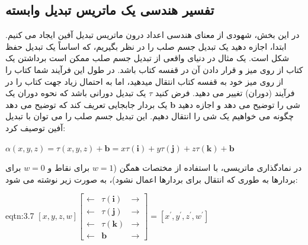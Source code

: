 \subsection{\textbf{تفسیر هندسی یک ماتریس تبدیل وابسته}}
\label{subsec:3.2.5}
{
    \Large
    \begin{spacing}{1.5}
        در این بخش، شهودی از معنای هندسی اعداد درون ماتریس تبدیل آفین ایجاد می کنیم.
        ابتدا، اجازه دهید یک تبدیل جسم صلب را در نظر بگیریم، که اساساً یک تبدیل حفظ شکل است.
        یک مثال در دنیای واقعی از تبدیل جسم صلب ممکن است برداشتن یک کتاب از روی میز و قرار دادن آن در قفسه کتاب باشد.
        در طول این فرآیند شما کتاب را از روی میز خود به قفسه کتاب انتقال میدهید، اما به احتمال زیاد جهت کتاب را در فرآیند (دوران) تغییر می دهید.
        فرض کنید $\tau$ یک تبدیل دورانی باشد که نحوه دوران یک شی را توضیح می دهد و اجازه دهید $\textbf{b}$ یک بردار جابجایی تعریف کند که توضیح می دهد چگونه می خواهیم یک شی را انتقال دهیم. این تبدیل جسم صلب را می توان با تبدیل آفین توصیف کرد:

        \begin{center}
            $\alpha(x,y,z)=\tau(x,y,z)+\textbf{b}=x\tau(\textbf{i})+y\tau(\textbf{j})+z\tau(\textbf{k})+\textbf{b}$
        \end{center}

        در نمادگذاری ماتریسی، با استفاده از مختصات همگن ($w=1$ برای نقاط و $w=0$ برای بردارها به طوری که انتقال برای بردارها اعمال نشود)، به صورت زیر نوشته می شود:

        \begin{eqtn}{eqtn:3.7}
            \centering
            $[x,y,z,w]\begin{bmatrix}
                          \leftarrow & \tau(\textbf{i}) & \rightarrow \\
                          \leftarrow & \tau(\textbf{j}) & \rightarrow \\
                          \leftarrow & \tau(\textbf{k}) & \rightarrow \\
                          \leftarrow & \textbf{b}       & \rightarrow
            \end{bmatrix}=[x^\prime,y^\prime,z^\prime,w^\prime]$
        \end{eqtn}


\end{spacing}}
